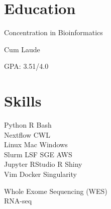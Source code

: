 
\begin{minipage}[t]{0.33\textwidth} %

\section{Education} 

\vspace{\topsep} %
\vspace{1pt}
\begin{tightitemize}
\item Concentration in Bioinformatics
\item Cum Laude
\item GPA: 3.51/4.0
\end{tightitemize}
\vspace{3pt}

\section{Skills}

Python \textbullet{} R \textbullet{} Bash \\ 
Nextflow \textbullet{} CWL \\
Linux \textbullet{} Mac \textbullet{} Windows\\
Slurm \textbullet{} LSF \textbullet{} SGE \textbullet{} AWS \\

Jupyter \textbullet{} RStudio \textbullet{} R Shiny\\
Vim \textbullet{} Docker \textbullet{} Singularity \\
\sectionspace %

Whole Exome Sequencing (WES) \\
RNA-seq \\


\end{minipage}
